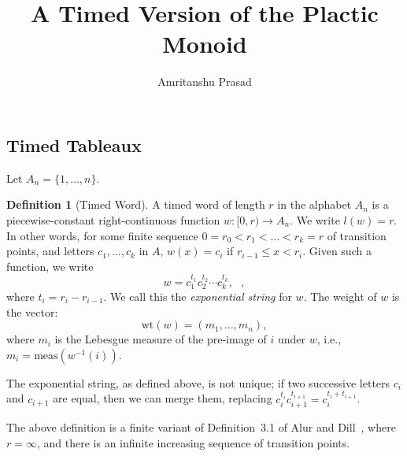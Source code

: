 \documentclass[10pt]{amsproc}
\title{A Timed Version of the Plactic Monoid}
\author{Amritanshu Prasad}
\theoremstyle{definition}
\newtheorem{definition}[theorem]{Definition}
\theoremstyle{remark}
\newcommand{\wt}{\mathrm{wt}}
\begin{document}
\renewcommand{\thesubsection}{\arabic{subsection}}
\maketitle
\subsection{Timed Tableaux}
\label{sec:timed-tableaux}
Let $A_n=\{1,\dotsc,n\}$.
\begin{definition}
  [Timed Word]
  \label{definition:timed-word}
  A timed word of length $r$ in the alphabet $A_n$ is a piecewise-constant right-continuous function $w:[0,r)\to A_n$.
  We write $l(w)=r$.
  In other words, for some finite sequence $0=r_0<r_1<\dotsc<r_k=r$ of transition points, and letters $c_1,\dotsc, c_k$ in $A$, $w(x) = c_i$ if $r_{i-1}\leq x < r_i$.
  Given such a function, we write
  \begin{equation}
    \label{eq:exp_not}
    w = c_1^{t_1} c_2^{t_2}\dotsb c_k^{t_k}, \text{ },
  \end{equation}
  where $t_i = r_i-r_{i-1}$.
  We call this the \emph{exponential string} for $w$.
  The weight of $w$ is the vector:
  \begin{displaymath}
    \wt(w) = (m_1,\dotsc,m_n),
  \end{displaymath}
  where $m_i$ is the Lebesgue measure of the pre-image of $i$ under $w$, i.e., $m_i=\mathrm{meas}(w^{-1}(i))$.
\end{definition}
The exponential string, as defined above, is not unique; if two successive letters $c_i$ and $c_{i+1}$ are equal, then we can merge them, replacing $c_i^{t_i}c_{i+1}^{t_{i+1}} = c_i^{t_i+t_{i+1}}$.

The above definition is a finite variant of Definition~3.1 of Alur and Dill~\cite{alur-dill}, where $r=\infty$, and there is an infinite increasing sequence of transition points.
\end{document}

